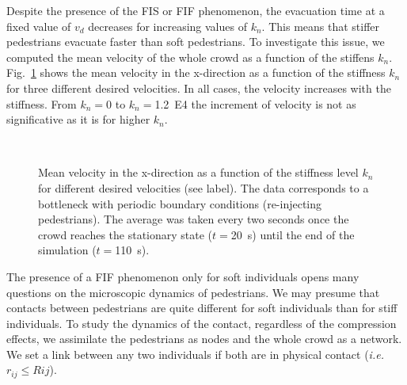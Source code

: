 \documentclass[preprint,12pt]{elsarticle}
\begin{document}
Despite the presence of the FIS or FIF phenomenon, the evacuation time at a 
fixed value of $v_d$ decreases for increasing values of $k_n$. This means that 
stiffer pedestrians evacuate faster than soft pedestrians. To investigate this 
issue, we computed the mean velocity of the whole crowd as a function of the 
stiffens $k_n$. Fig.~\ref{kn_vs_vx_bottleneck} shows the mean velocity in the 
x-direction as a function of the stiffness $k_n$ for three different desired 
velocities. In all cases, the velocity increases with the stiffness. From 
$k_n=0$ to $k_n=$1.2~E4 the increment of velocity is not as significative as it 
is for higher $k_n$. \\


\begin{figure}[!htbp]
\centering
    \\
\caption[width=0.47\columnwidth]{Mean velocity in the x-direction as a function 
of the stiffness level $k_n$ for different desired velocities (see label). The 
data corresponds to a bottleneck with periodic boundary conditions (re-injecting 
pedestrians). The average was taken every two seconds once the crowd reaches the 
stationary state ($t=$20~s) until the end of the simulation ($t=$110~s). }
\label{kn_vs_vx_bottleneck}
\end{figure}


The presence of a FIF phenomenon only for soft individuals opens many questions 
on the microscopic dynamics of pedestrians. We may presume that contacts 
between pedestrians are quite different for soft individuals than for stiff 
individuals. To study the dynamics of the contact, regardless of the compression 
effects, we assimilate the pedestrians as nodes and the whole crowd as a 
network. We set a link between any two individuals if both are in physical 
contact (\textit{i.e.} $r_{ij} \leq R{ij}$).\\
\end{document}
